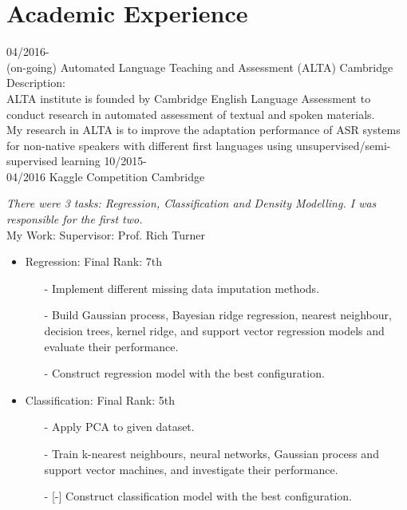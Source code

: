 \documentclass[]{friggeri-cv}
\begin{document}
\section{Academic Experience}
\begin{entrylist}
  \entry
    {04/2016-\\(on-going)}
    {Automated Language Teaching and Assessment (ALTA)}
    {Cambridge}
    {\textsf{Description:}\\
    ALTA institute is founded by Cambridge English Language Assessment to conduct research  in automated assessment of textual and spoken materials.\medskip \\
    My research in ALTA is to improve the adaptation performance of ASR systems for non-native speakers with different first languages using unsupervised/semi-supervised learning}
\entry
    {10/2015-\\04/2016}
    {Kaggle Competition}
    {Cambridge}
    {\emph{There were 3 tasks: Regression, Classification and Density Modelling. I was responsible for the first two.}\\
    \textsf{My Work:}\hfill{\footnotesize{} Supervisor: Prof. Rich Turner}
    \begin{itemize}
    \item Regression: \hfill{\footnotesize{} Final Rank: 7th}
    \begin{itemize}
	   \item[-] Implement different missing data imputation methods.
	   \item[-] Build Gaussian process, Bayesian ridge regression, nearest neighbour, decision trees, kernel ridge, and support vector regression models and evaluate their performance.
	   \item[-] Construct regression model with the best configuration.
    \end{itemize}
    \item Classification:\hfill{\footnotesize{} Final Rank: 5th}
	\begin{itemize}
	\item[-] Apply PCA to given dataset. 
	\item[-] Train k-nearest neighbours, neural networks, Gaussian process and support vector machines, and investigate their performance.
	\item[-] [-] Construct classification model with the best configuration.
	\end{itemize}   
    \end{itemize}}     
\end{entrylist}
\end{document}
